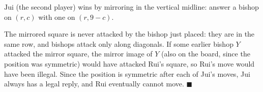 $\boxed{\text{Jui}}$ (the second player) wins by mirroring in the vertical midline: answer a bishop on $(r,c)$ with one on $(r,9-c)$.

The mirrored square is never attacked by the bishop just placed: they are in the same row, and bishops attack only along diagonals. If some earlier bishop $Y$ attacked the mirror square, the mirror image of $Y$ (also on the board, since the position was symmetric) would have attacked Rui's square, so Rui's move would have been illegal. Since the position is symmetric after each of Jui's moves, Jui always has a legal reply, and Rui eventually cannot move. $\blacksquare$
